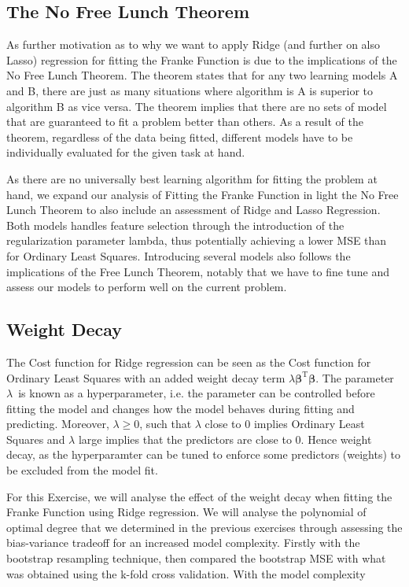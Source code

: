 \documentclass[11pt, a4paper]{article}
\begin{document}
\subsection*{The No Free Lunch Theorem}
As further motivation as to why we want to apply Ridge (and further on also Lasso) regression for fitting the Franke Function is due to the implications of the No Free Lunch Theorem. The theorem states that for any two learning models A and B, there are just as many situations where algorithm is A is superior to algorithm B as vice versa. \cite{Wolpert1996} The theorem implies that there are no sets of model that are guaranteed to fit a problem better than others. As a result of the theorem, regardless of the data being fitted, different models have to be individually evaluated for the given task at hand.

As there are no universally best learning algorithm for fitting the problem at hand, we expand our analysis of Fitting the Franke Function in light the No Free Lunch Theorem to also include an assessment of Ridge and Lasso Regression. Both models handles feature selection through the introduction of the regularization parameter lambda, thus potentially achieving a lower MSE than for Ordinary Least Squares. Introducing several models also follows the implications of the Free Lunch Theorem, notably that we have to fine tune and assess our models to perform well on the current problem. \cite{Goodfellow2016}

\subsection*{Weight Decay}
The Cost function for Ridge regression can be seen as the Cost function for Ordinary Least Squares with an added weight decay term $\lambda\bm{\beta}^\text{T}\bm{\beta}$. The parameter $\lambda$ is known as a hyperparameter, i.e. the parameter can be controlled before fitting the model and changes how the model behaves during fitting and predicting. \cite{Goodfellow2016} Moreover, $\lambda \geq 0$, such that $\lambda$ close to $0$ implies Ordinary Least Squares and $\lambda$ large implies that the predictors are close to $0$. Hence weight decay, as the hyperparamter can be tuned to enforce some predictors (weights) to be excluded from the model fit.

For this Exercise, we will analyse the effect of the weight decay when fitting the Franke Function using Ridge regression. We will analyse the polynomial of optimal degree that we determined in the previous exercises through assessing the bias-variance tradeoff for an increased model complexity. Firstly with the bootstrap resampling technique, then compared the bootstrap MSE with what was obtained using the k-fold cross validation. With the model complexity  
\end{document}
